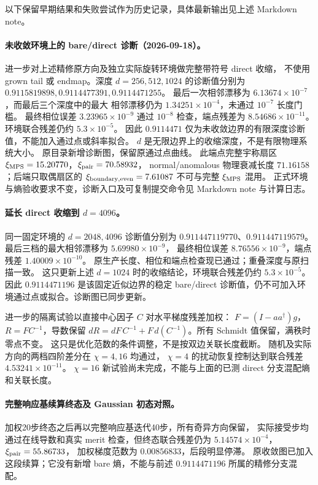 以下保留早期结果和失败尝试作为历史记录，具体最新输出见上述 Markdown note。


\paragraph{未收敛环境上的 bare/direct 诊断（2026-09-18）。}
进一步对上述精修原方向及独立实际旋转环境做完整带符号 direct 收缩，
不使用 grown tail 或 endmap。深度 $d=256,512,1024$ 的诊断值分别为
$0.9115819898,0.9114477391,0.9114471255$。
最后一次相邻漂移为 $6.13674\times10^{-7}$，而最后三个深度中的最大
相邻漂移仍为 $1.34251\times10^{-4}$，未通过 $10^{-7}$ 长度门槛。
最终相位误差 $3.23965\times10^{-9}$ 通过 $10^{-8}$ 检查，端点残差为
$8.54686\times10^{-11}$。环境联合残差仍约 $5.3\times10^{-5}$。
因此 $0.9114471$ 仅为未收敛边界的有限深度诊断值，不能加入通过点或斜率拟合。
$d$ 是无限边界上的收缩深度，不是有限物理系统大小。
原目录新增诊断图，保留原通过点曲线。
此端点完整宇称扇区 $\xi_{\rm MPS}=15.20770$，$\xi_{\rm pair}=70.58932$，
normal/anomalous 物理衰减长度 $71.16158$；后端只取偶扇区的
$\xi_{\rm boundary,even}=7.61087$ 不可与完整 $\xi_{\rm MPS}$ 混用。
正式环境与熵验收要求不变，诊断入口及可复制提交命令见 Markdown note 与计算日志。


\paragraph{延长 direct 收缩到 $d=4096$。}
同一固定环境的 $d=2048,4096$ 诊断值分别为
$0.911447119770$、$0.911447119579$。
最后三档的最大相邻漂移为 $5.69980\times10^{-9}$，
最终相位误差 $8.76556\times10^{-9}$，端点残差 $1.40009\times10^{-10}$。
原生产长度、相位和端点检查现已通过；重叠深度与原扫描一致。
这只更新上述 $d=1024$ 时的收缩结论，环境联合残差仍约
$5.3\times10^{-5}$。因此 $0.9114471196$ 是该固定近似边界的稳定
bare/direct 诊断值，仍不可加入环境通过点或拟合。诊断图已同步更新。

进一步的隔离试验以直接中心因子 $C$ 对水平梯度残差加权：
$F=(I-aa^\dagger)g$，$R=FC^{-1}$，导数保留
$dR=dF\,C^{-1}+F\,d(C^{-1})$。所有 Schmidt 值保留，满秩时零点不变。
这只是优化范数的条件调整，不是按双边关联长度截断。
随机及实际方向的两档四阶差分在 $\chi=4,16$ 均通过，
$\chi=4$ 的扰动恢复控制达到联合残差 $4.53241\times10^{-11}$。
$\chi=16$ 新试验尚未完成，不能与上面的已测 direct 分支混配熵和关联长度。


\paragraph{完整响应基续算终态及 Gaussian 初态对照。}
加权20步终态之后再以完整响应基迭代40步，所有奇异方向保留，
实际接受步均通过在线导数和真实 merit 检查，但终态联合残差仍为
$5.14574\times10^{-4}$，$\xi_{\rm pair}=55.86733$，
加权梯度范数为 $0.00856833$，后段明显停滞。
原收敛图已加入这段续算；它没有新增 bare 熵，不能与前述
$0.9114471196$ 所属的精修分支混配。

